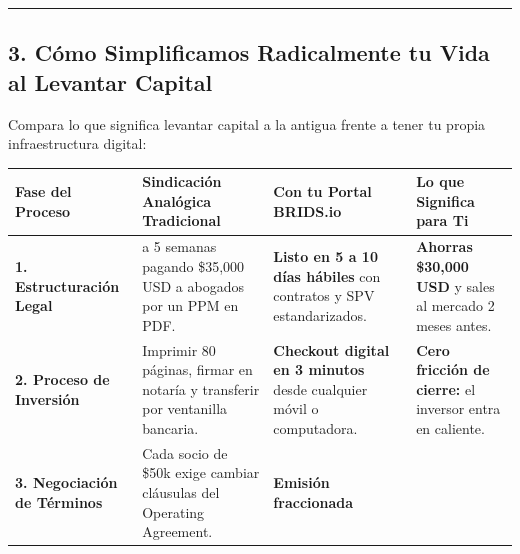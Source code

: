\documentclass[
]{article}
\newcounter{none} %
\begin{document}
\begin{center}\rule{0.5\linewidth}{0.5pt}\end{center}

\subsection{3. Cómo Simplificamos Radicalmente tu Vida al Levantar
Capital}\label{cuxf3mo-simplificamos-radicalmente-tu-vida-al-levantar-capital}

Compara lo que significa levantar capital a la antigua frente a tener tu
propia infraestructura digital:

{\def\LTcaptype{none} %
\begin{longtable}[]{@{}
  >{\raggedright\arraybackslash}p{}
  >{\raggedright\arraybackslash}p{}
  >{\raggedright\arraybackslash}p{}
  >{\raggedright\arraybackslash}p{}@{}}
\toprule\noalign{}
\begin{minipage}[b]{\linewidth}\raggedright
Fase del Proceso
\end{minipage} & \begin{minipage}[b]{\linewidth}\raggedright
Sindicación Analógica Tradicional
\end{minipage} & \begin{minipage}[b]{\linewidth}\raggedright
Con tu Portal BRIDS.io
\end{minipage} & \begin{minipage}[b]{\linewidth}\raggedright
Lo que Significa para Ti
\end{minipage} \\
\midrule\noalign{}
\endhead
\bottomrule\noalign{}
\endlastfoot
\textbf{1. Estructuración Legal} & 3 a 5 semanas pagando \$35,000 USD a
abogados por un PPM en PDF. & \textbf{Listo en 5 a 10 días hábiles} con
contratos y SPV estandarizados. & \textbf{Ahorras \$30,000 USD} y sales
al mercado 2 meses antes. \\
\textbf{2. Proceso de Inversión} & Imprimir 80 páginas, firmar en
notaría y transferir por ventanilla bancaria. & \textbf{Checkout digital
en 3 minutos} desde cualquier móvil o computadora. & \textbf{Cero
fricción de cierre:} el inversor entra en caliente. \\
\textbf{3. Negociación de Términos} & Cada socio de \$50k exige cambiar
cláusulas del Operating Agreement. & \textbf{Emisión fraccionada
}
\end{longtable}}
\end{document}
